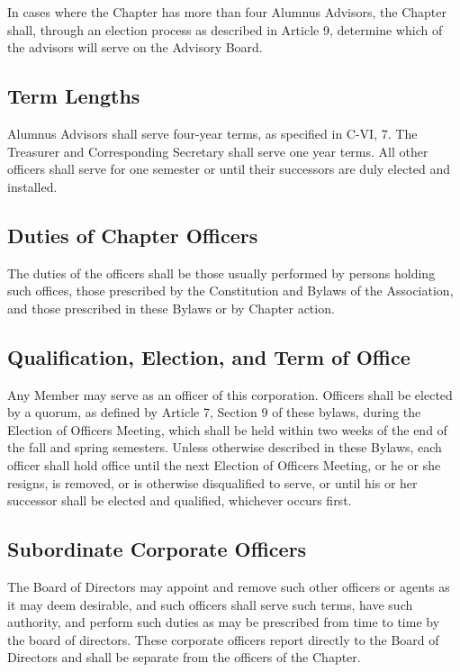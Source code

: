 \documentclass{article}
\begin{document}
	In cases where the Chapter has more than four Alumnus Advisors, the Chapter shall, through an election process as described in Article 9, determine which of the advisors will serve on the Advisory Board.
	\subsection{Term Lengths}
	Alumnus Advisors shall serve four-year terms, as specified in C-VI, 7. The Treasurer and Corresponding Secretary shall serve one year terms. All other officers shall serve for one semester or until their successors are duly elected and installed.
	\subsection{Duties of Chapter Officers}
	The duties of the officers shall be those usually performed by persons holding such offices, those prescribed by the Constitution and Bylaws of the Association, and those prescribed in these Bylaws or by Chapter action.
	\subsection{Qualification, Election, and Term of Office}
	Any Member may serve as an officer of this corporation. Officers shall be elected by a quorum, as defined by Article 7, Section 9 of these bylaws, during the Election of Officers Meeting, which shall be held within two weeks of the end of the fall and spring semesters. Unless otherwise described in these Bylaws, each officer shall hold office until the next Election of Officers Meeting, or he or she resigns, is removed, or is otherwise disqualified to serve, or until his or her successor shall be elected and qualified, whichever occurs first.
	\subsection{Subordinate Corporate Officers} %
	The Board of Directors may appoint and remove such other officers or agents as it may deem desirable, and such officers shall serve such terms, have such authority, and perform such duties as may be prescribed from time to time by the board of directors. These corporate officers report directly to the Board of Directors and shall be separate from the officers of the Chapter.
\end{document}
